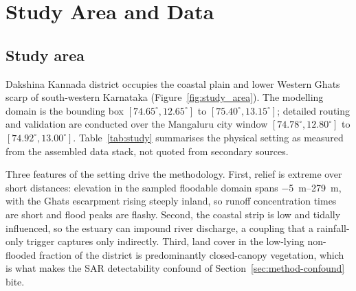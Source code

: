\documentclass[journal]{IEEEtran}
\begin{document}
\section{Study Area and Data}
\label{sec:study}

\subsection{Study area}
Dakshina Kannada district occupies the coastal plain and lower Western Ghats
scarp of south-western Karnataka (Figure~\ref{fig:study_area}). The modelling
domain is the bounding box $[74.65^\circ, 12.65^\circ]$ to
$[75.40^\circ, 13.15^\circ]$; detailed routing and validation are conducted over
the Mangaluru city window $[74.78^\circ, 12.80^\circ]$ to
$[74.92^\circ, 13.00^\circ]$. Table~\ref{tab:study} summarises the physical
setting as measured from the assembled data stack, not quoted from
secondary sources.

Three features of the setting drive the methodology. First, relief is extreme
over short distances: elevation in the sampled floodable domain spans
\SIrange{-5}{279}{\metre}, with the Ghats escarpment rising steeply inland, so
runoff concentration times are short and flood peaks are flashy. Second, the
coastal strip is low and tidally influenced, so the estuary can impound river
discharge, a coupling that a rainfall-only trigger captures only indirectly.
Third, land cover in the low-lying non-flooded fraction of the district is
predominantly closed-canopy vegetation, which is what makes the SAR detectability
confound of Section~\ref{sec:method-confound} bite.
\end{document}
